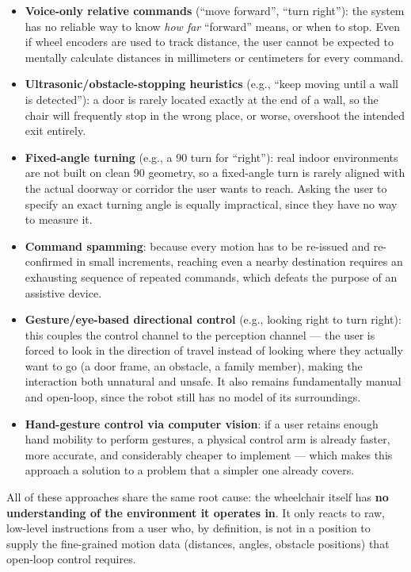 \begin{itemize}
    \item \textbf{Voice-only relative commands} (``move forward'', ``turn right''): the system has no reliable way to know \emph{how far} ``forward'' means, or when to stop. Even if wheel encoders are used to track distance, the user cannot be expected to mentally calculate distances in millimeters or centimeters for every command.
    \item \textbf{Ultrasonic/obstacle-stopping heuristics} (e.g., ``keep moving until a wall is detected''): a door is rarely located exactly at the end of a wall, so the chair will frequently stop in the wrong place, or worse, overshoot the intended exit entirely.
    \item \textbf{Fixed-angle turning} (e.g., a 90\degree{} turn for ``right''): real indoor environments are not built on clean 90\degree{} geometry, so a fixed-angle turn is rarely aligned with the actual doorway or corridor the user wants to reach. Asking the user to specify an exact turning angle is equally impractical, since they have no way to measure it.
    \item \textbf{Command spamming}: because every motion has to be re-issued and re-confirmed in small increments, reaching even a nearby destination requires an exhausting sequence of repeated commands, which defeats the purpose of an assistive device.
    \item \textbf{Gesture/eye-based directional control} (e.g., looking right to turn right): this couples the control channel to the perception channel --- the user is forced to look in the direction of travel instead of looking where they actually want to go (a door frame, an obstacle, a family member), making the interaction both unnatural and unsafe. It also remains fundamentally manual and open-loop, since the robot still has no model of its surroundings.
    \item \textbf{Hand-gesture control via computer vision}: if a user retains enough hand mobility to perform gestures, a physical control arm is already faster, more accurate, and considerably cheaper to implement --- which makes this approach a solution to a problem that a simpler one already covers.
\end{itemize}

All of these approaches share the same root cause: the wheelchair itself has \textbf{no understanding of the environment it operates in}. It only reacts to raw, low-level instructions from a user who, by definition, is not in a position to supply the fine-grained motion data (distances, angles, obstacle positions) that open-loop control requires.

